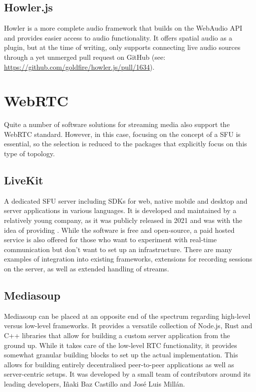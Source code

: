 \subsection{Howler.js}

Howler is a more complete audio framework that builds on the WebAudio \ac{API} and provides easier access to audio functionality. It offers spatial audio as a plugin, but at the time of writing, only supports connecting live audio sources through a yet unmerged pull request on GitHub (see: \href{https://github.com/goldfire/howler.js/pull/1634}{https://github.com/goldfire/howler.js/pull/1634}).


\section{WebRTC}

Quite a number of software solutions for streaming media also support the WebRTC standard. However, in this case, focusing on the concept of a \ac{SFU} is essential, so the selection is reduced to the packages that explicitly focus on this type of topology.



\subsection{LiveKit}

A dedicated \ac{SFU} server including \ac{SDK}s for web, native mobile and desktop and server applications in various languages. It is developed and maintained by a relatively young company, as it was publicly released in 2021 and was  with the idea of providing  \parencite{livekitAbout}. While the software is free and open-source, a paid hosted service is also offered for those who want to experiment with real-time communication but don't want to set up an infrastructure. There are many examples of integration into existing frameworks, extensions for recording sessions on the server, as well as extended handling of streams.

\subsection{Mediasoup}

Mediasoup can be placed at an opposite end of the spectrum regarding high-level versus low-level frameworks. It provides a versatile collection of Node.js, Rust and C++ libraries that allow for building a custom server application from the ground up. While it takes care of the low-level \ac{RTC} functionality, it provides somewhat granular building blocks to set up the actual implementation. This allows for building entirely decentralised peer-to-peer applications as well as server-centric setups. It was developed by a small team of contributors around its leading developers, Iñaki Baz Castillo and José Luis Millán.

